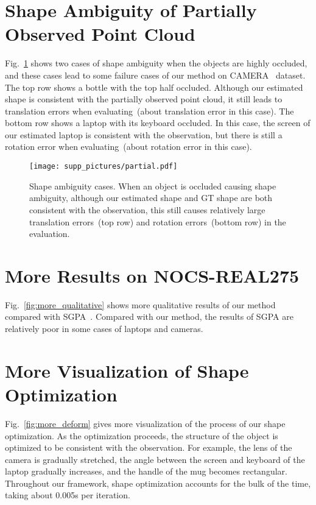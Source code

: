 \documentclass{article}
\begin{document}
\section{Shape Ambiguity of Partially Observed Point Cloud}
\label{supp:sec:ambiguity}
Fig.~\ref{fig:partial} shows two cases of shape ambiguity when the objects are highly occluded, and these cases lead to some failure cases of our method on CAMERA~\cite{NOCS} dataset.
The top row shows a bottle with the top half occluded. Although our estimated shape is consistent with the partially observed point cloud, it still leads to translation errors when evaluating~(about  translation error in this case). The bottom row shows a laptop with its keyboard occluded. In this case, the screen of our estimated laptop is consistent with the observation, but there is still a rotation error when evaluating~(about  rotation error in this case). 
\begin{figure}
    \centering
    \texttt{[image: supp\_pictures/partial.pdf]}
    \caption{Shape ambiguity cases. When an object is occluded causing shape ambiguity, although our estimated shape and GT shape are both consistent with the observation, this still causes relatively large translation errors~(top row) and rotation errors~(bottom row) in the evaluation.}
    \label{fig:partial}
\end{figure} \setcounter{section}{3}
\section{More Results on NOCS-REAL275}
\label{supp:nocs_qualitative}
Fig.~\ref{fig:more_qualitative} shows more qualitative results of our method compared with SGPA~\cite{SGPA}. Compared with our method, the results of SGPA are relatively poor in some cases of laptops and cameras. \setcounter{section}{4}
\section{More Visualization of Shape Optimization}
\label{supp:deform_vis}
Fig.~\ref{fig:more_deform} gives more visualization of the process of our shape optimization. As the optimization proceeds, the structure of the object is optimized to be consistent with the observation. For example, the lens of the camera is gradually stretched, the angle between the screen and keyboard of the laptop gradually increases, and the handle of the mug becomes rectangular. Throughout our framework, shape optimization accounts for the bulk of the time, taking about 0.005s per iteration.
 \setcounter{section}{5}
\end{document}
